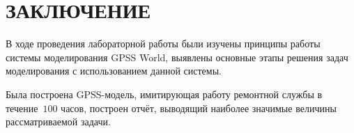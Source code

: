 \section*{ЗАКЛЮЧЕНИЕ}

В ходе проведения лабораторной работы были изучены принципы работы системы моделирования
GPSS World, выявлены основные этапы  решения задач моделирования с использованием данной системы.

Была построена GPSS-модель, имитирующая работу ремонтной службы в течение~$100$ часов,
построен отчёт, выводящий наиболее значимые величины рассматриваемой задачи.

\newpage
